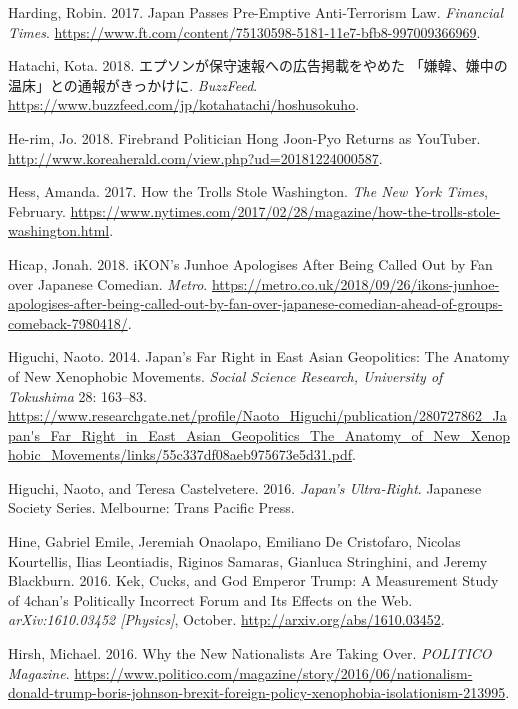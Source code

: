 \documentclass[10pt,british,A4paper,,openany]{memoir}
\begin{document}
\hypertarget{ref-harding_japan_2017}{}
Harding, Robin. 2017. Japan Passes Pre-Emptive Anti-Terrorism Law.
\emph{Financial Times}.
\url{https://www.ft.com/content/75130598-5181-11e7-bfb8-997009366969}.

\hypertarget{ref-hatachi__2018}{}
Hatachi, Kota. 2018. エプソンが保守速報への広告掲載をやめた
「嫌韓、嫌中の温床」との通報がきっかけに. \emph{BuzzFeed}.
\url{https://www.buzzfeed.com/jp/kotahatachi/hoshusokuho}.

\hypertarget{ref-he-rim_firebrand_2018}{}
He-rim, Jo. 2018. Firebrand Politician Hong Joon-Pyo Returns as
YouTuber. \url{http://www.koreaherald.com/view.php?ud=20181224000587}.

\hypertarget{ref-hess_how_2017}{}
Hess, Amanda. 2017. How the Trolls Stole Washington. \emph{The New York
Times}, February.
\url{https://www.nytimes.com/2017/02/28/magazine/how-the-trolls-stole-washington.html}.

\hypertarget{ref-hicap_ikons_2018}{}
Hicap, Jonah. 2018. iKON's Junhoe Apologises After Being Called Out by
Fan over Japanese Comedian. \emph{Metro}.
\url{https://metro.co.uk/2018/09/26/ikons-junhoe-apologises-after-being-called-out-by-fan-over-japanese-comedian-ahead-of-groups-comeback-7980418/}.

\hypertarget{ref-higuchi_japans_2014}{}
Higuchi, Naoto. 2014. Japan's Far Right in East Asian Geopolitics: The
Anatomy of New Xenophobic Movements. \emph{Social Science Research,
University of Tokushima} 28: 163--83.
\url{https://www.researchgate.net/profile/Naoto_Higuchi/publication/280727862_Japan's_Far_Right_in_East_Asian_Geopolitics_The_Anatomy_of_New_Xenophobic_Movements/links/55c337df08aeb975673e5d31.pdf}.

\hypertarget{ref-higuchi_japans_2016}{}
Higuchi, Naoto, and Teresa Castelvetere. 2016. \emph{Japan's
Ultra-Right}. Japanese Society Series. Melbourne: Trans Pacific Press.

\hypertarget{ref-hine_kek_2016}{}
Hine, Gabriel Emile, Jeremiah Onaolapo, Emiliano De Cristofaro, Nicolas
Kourtellis, Ilias Leontiadis, Riginos Samaras, Gianluca Stringhini, and
Jeremy Blackburn. 2016. Kek, Cucks, and God Emperor Trump: A Measurement
Study of 4chan's Politically Incorrect Forum and Its Effects on the Web.
\emph{arXiv:1610.03452 {[}Physics{]}}, October.
\url{http://arxiv.org/abs/1610.03452}.

\hypertarget{ref-hirsh_why_2016}{}
Hirsh, Michael. 2016. Why the New Nationalists Are Taking Over.
\emph{POLITICO Magazine}.
\url{https://www.politico.com/magazine/story/2016/06/nationalism-donald-trump-boris-johnson-brexit-foreign-policy-xenophobia-isolationism-213995}.
\end{document}
